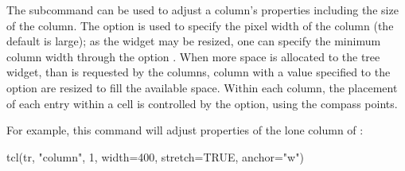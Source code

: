 The  subcommand can be used to adjust
a column's properties including the size of the column. The option
 is used to specify the pixel width of the column (the
default is large); as the widget may be resized, one can specify the
minimum column width through the option . When more
space is allocated to the tree widget, than is requested by the
columns, column with a  value specified to the option
 are resized to fill the available space. Within each
column, the placement of each entry within a cell is controlled by the
 option, using the compass points.

For example, this command will adjust properties of the lone column of :
\begin{Schunk}
\begin{Sinput}
 tcl(tr, "column", 1, width=400,  stretch=TRUE, anchor="w")
\end{Sinput}
\end{Schunk}


